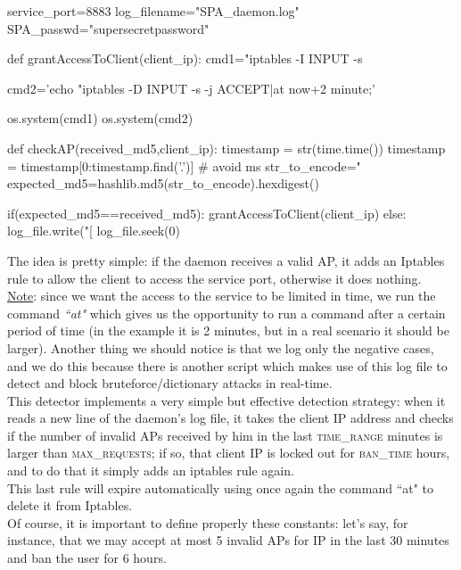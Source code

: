 \documentclass[12pt]{report}
\begin{document}
{{\begin{python}
service_port=8883
log_filename="SPA_daemon.log"
SPA_passwd="supersecretpassword"

def grantAccessToClient(client_ip):
  cmd1="iptables -I INPUT -s %
  
  cmd2='echo "iptables -D INPUT -s %
        -j ACCEPT|at now+2 minute;' %
        
  os.system(cmd1)
  os.system(cmd2)                                      
                                         
                                                            
def checkAP(received_md5,client_ip):
  timestamp = str(time.time())
  timestamp = timestamp[0:timestamp.find('.')] # avoid ms
  str_to_encode="%
  expected_md5=hashlib.md5(str_to_encode).hexdigest()

  if(expected_md5==received_md5):
    grantAccessToClient(client_ip)
  else:
    log_file.write("[%
    log_file.seek(0)
  
\end{python}
\bigskip

The idea is pretty simple: if the daemon receives a valid AP, it adds an Iptables rule to allow the client to access the service port, otherwise it does nothing.\\
\underline{Note}: since we want the access to the service to be limited in time, we run the command \emph{``at"} which gives us the opportunity to run a command after a certain period of time (in the example it is 2 minutes, but in a real scenario it should be larger). Another thing we should notice is that we log only the negative cases, and we do this because there is another script which makes use of this log file to detect and block bruteforce/dictionary attacks in real-time.\\

This detector implements a very simple but effective detection strategy: when it reads a new line of the daemon's log file, it takes the client IP address and checks if the number of invalid APs received by him in the last \textsc{time\_range} minutes is larger than \textsc{max\_requests}; if so, that client IP is locked out for \textsc{ban\_time} hours, and to do that it simply adds an iptables rule again.\\
This last rule will expire automatically using once again the command ``at" to delete it from Iptables.\\
Of course, it is important to define properly these constants: let's say, for instance, that we may accept at most 5 invalid APs for IP in the last 30 minutes and ban the user for 6 hours.\\

}}
\end{document}
